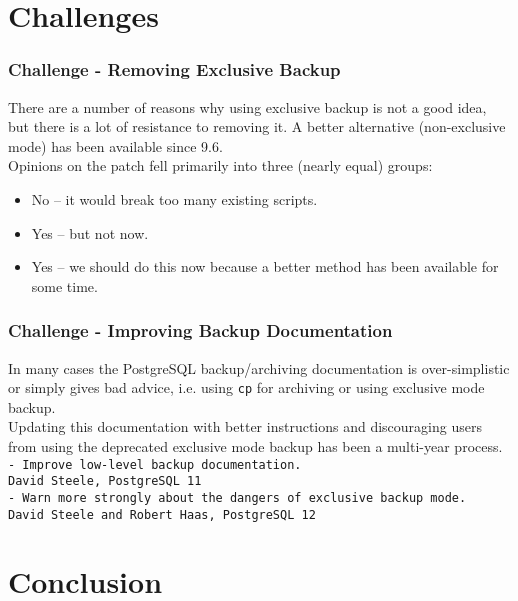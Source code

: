 \section{Challenges}

\begin{frame}
    \frametitle{Challenge - Removing Exclusive Backup}

    There are a number of reasons why using exclusive backup is not a good idea, but there is a lot of resistance to removing it.  A better alternative (non-exclusive mode) has been available since 9.6.\pause \\
    \vspace{1em}
    Opinions on the patch fell primarily into three (nearly equal) groups:\pause
    \begin{itemize}
        \item No -- it would break too many existing scripts.\pause
        \item Yes -- but not now.\pause
        \item Yes -- we should do this now because a better method has been available for some time.
    \end{itemize}
\end{frame}

\begin{frame}
    \frametitle{Challenge - Improving Backup Documentation}

    In many cases the PostgreSQL backup/archiving documentation is over-simplistic or simply gives bad advice, i.e. using \texttt{cp} for archiving or using exclusive mode backup. \\
    \vspace{1em}
    Updating this documentation with better instructions and discouraging users from using the deprecated exclusive mode backup has been a multi-year process. \\
    \vspace{1em}
    \texttt{- Improve low-level backup documentation.} \\
    \texttt{David Steele, PostgreSQL 11} \\
    \vspace{1em}
    \texttt{- Warn more strongly about the dangers of exclusive backup mode.} \\
    \texttt{David Steele and Robert Haas, PostgreSQL 12}
\end{frame}

\section{Conclusion}


